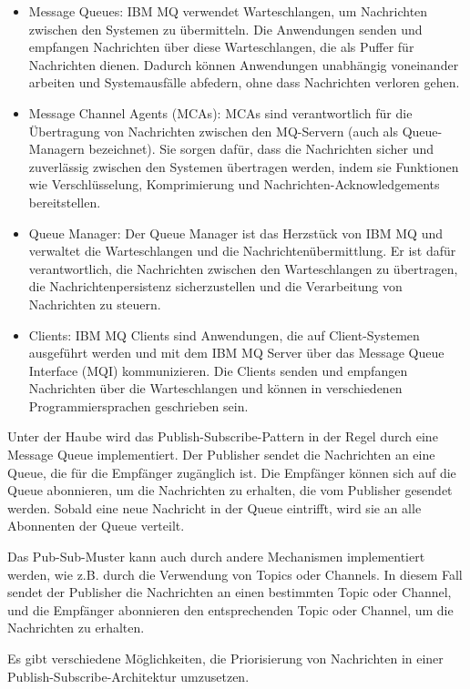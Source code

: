 \begin{itemize}
\item Message Queues: IBM MQ verwendet Warteschlangen, um Nachrichten zwischen den Systemen zu übermitteln. Die Anwendungen senden und empfangen Nachrichten über diese Warteschlangen, die als Puffer für Nachrichten dienen. Dadurch können Anwendungen unabhängig voneinander arbeiten und Systemausfälle abfedern, ohne dass Nachrichten verloren gehen.
\item Message Channel Agents (MCAs): MCAs sind verantwortlich für die Übertragung von Nachrichten zwischen den MQ-Servern (auch als Queue-Managern bezeichnet). Sie sorgen dafür, dass die Nachrichten sicher und zuverlässig zwischen den Systemen übertragen werden, indem sie Funktionen wie Verschlüsselung, Komprimierung und Nachrichten-Acknowledgements bereitstellen.
\item Queue Manager: Der Queue Manager ist das Herzstück von IBM MQ und verwaltet die Warteschlangen und die Nachrichtenübermittlung. Er ist dafür verantwortlich, die Nachrichten zwischen den Warteschlangen zu übertragen, die Nachrichtenpersistenz sicherzustellen und die Verarbeitung von Nachrichten zu steuern.
\item Clients: IBM MQ Clients sind Anwendungen, die auf Client-Systemen ausgeführt werden und mit dem IBM MQ Server über das Message Queue Interface (MQI) kommunizieren. Die Clients senden und empfangen Nachrichten über die Warteschlangen und können in verschiedenen Programmiersprachen geschrieben sein.
\end{itemize}

Unter der Haube wird das Publish-Subscribe-Pattern in der Regel durch eine Message Queue implementiert. Der Publisher sendet die Nachrichten an eine Queue, die für die Empfänger zugänglich ist. Die Empfänger können sich auf die Queue abonnieren, um die Nachrichten zu erhalten, die vom Publisher gesendet werden. Sobald eine neue Nachricht in der Queue eintrifft, wird sie an alle Abonnenten der Queue verteilt.

Das Pub-Sub-Muster kann auch durch andere Mechanismen implementiert werden, wie z.B. durch die Verwendung von Topics oder Channels. In diesem Fall sendet der Publisher die Nachrichten an einen bestimmten Topic oder Channel, und die Empfänger abonnieren den entsprechenden Topic oder Channel, um die Nachrichten zu erhalten.

Es gibt verschiedene Möglichkeiten, die Priorisierung von Nachrichten in einer Publish-Subscribe-Architektur umzusetzen.

